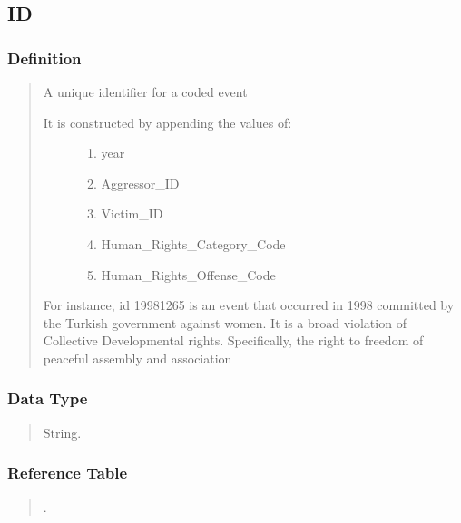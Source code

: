 \documentclass[letterpaper,10pt,english]{sphinxmanual}
\begin{document}
\subsection{ID}
\label{\detokenize{database_schema:id}}

\subsubsection{Definition}
\label{\detokenize{database_schema:id88}}\begin{quote}

\sphinxAtStartPar
A unique identifier for a coded event
\begin{description}
\item[{It is constructed by appending the values of:}] \leavevmode\begin{enumerate}
%
\item {} 
\sphinxAtStartPar
year

\item {} 
\sphinxAtStartPar
Aggressor\_ID

\item {} 
\sphinxAtStartPar
Victim\_ID

\item {} 
\sphinxAtStartPar
Human\_Rights\_Category\_Code

\item {} 
\sphinxAtStartPar
Human\_Rights\_Offense\_Code

\end{enumerate}

\end{description}

\sphinxAtStartPar
For instance, id 19981265 is an event that occurred in 1998 committed by the Turkish government against women.  It is a broad violation of Collective Developmental rights.  Specifically, the right to freedom of peaceful assembly and association
\end{quote}


\subsubsection{Data Type}
\label{\detokenize{database_schema:id89}}\begin{quote}

\sphinxAtStartPar
String.
\end{quote}


\subsubsection{Reference Table}
\label{\detokenize{database_schema:id90}}\begin{quote}

\sphinxAtStartPar
{\hyperref[\detokenize{database_schema:overview-table}]{}}.
\end{quote}
\end{document}
